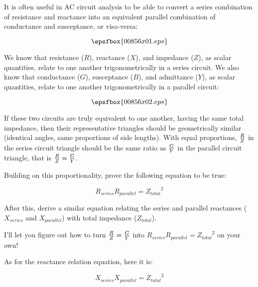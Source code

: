 

It is often useful in AC circuit analysis to be able to convert a series combination of resistance and reactance into an equivalent parallel combination of conductance and susceptance, or visa-versa:

$$\epsfbox{00856x01.eps}$$

We know that resistance ($R$), reactance ($X$), and impedance ($Z$), as scalar quantities, relate to one another trigonometrically in a series circuit.  We also know that conductance ($G$), susceptance ($B$), and admittance ($Y$), as scalar quantities, relate to one another trigonometrically in a parallel circuit:

$$\epsfbox{00856x02.eps}$$

If these two circuits are truly equivalent to one another, having the same total impedance, then their representative triangles should be geometrically similar (identical angles, same proportions of side lengths).  With equal proportions, ${R \over Z}$ in the series circuit triangle should be the same ratio as ${G \over Y}$ in the parallel circuit triangle, that is ${R \over Z} = {G \over Y}$.  

Building on this proportionality, prove the following equation to be true:

$$R_{series} R_{parallel} = {Z_{total}}^2$$

After this, derive a similar equation relating the series and parallel reactances ($X_{series}$ and $X_{parallel}$) with total impedance ($Z_{total}$).







I'll let you figure out how to turn ${R \over Z} = {G \over Y}$ into $R_{series} R_{parallel} = {Z_{total}}^2$ on your own!

\vskip 10pt

As for the reactance relation equation, here it is:

$$X_{series} X_{parallel} = {Z_{total}}^2$$







